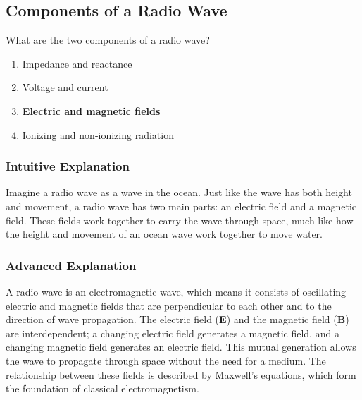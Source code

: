 \subsection{Components of a Radio Wave}
\label{T3B03}

\begin{tcolorbox}[colback=gray!10!white,colframe=black!75!black,title=T3B03]
What are the two components of a radio wave?
\begin{enumerate}[noitemsep]
    \item Impedance and reactance
    \item Voltage and current
    \item \textbf{Electric and magnetic fields}
    \item Ionizing and non-ionizing radiation
\end{enumerate}
\end{tcolorbox}

\subsubsection*{Intuitive Explanation}
Imagine a radio wave as a wave in the ocean. Just like the wave has both height and movement, a radio wave has two main parts: an electric field and a magnetic field. These fields work together to carry the wave through space, much like how the height and movement of an ocean wave work together to move water.

\subsubsection*{Advanced Explanation}
A radio wave is an electromagnetic wave, which means it consists of oscillating electric and magnetic fields that are perpendicular to each other and to the direction of wave propagation. The electric field (\textbf{E}) and the magnetic field (\textbf{B}) are interdependent; a changing electric field generates a magnetic field, and a changing magnetic field generates an electric field. This mutual generation allows the wave to propagate through space without the need for a medium. The relationship between these fields is described by Maxwell's equations, which form the foundation of classical electromagnetism.